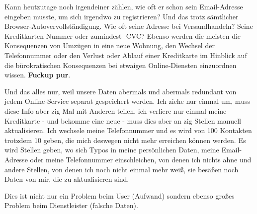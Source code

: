 \vspace{0.3cm}


\begin{Problem}

Kann heutzutage noch irgendeiner zählen, wie oft er schon sein Email-Adresse eingeben musste, um sich irgendwo zu registrieren? Und das trotz sämtlicher Browser-Autovervollständigung. Wie oft seine Adresse bei Versandhandeln? Seine Kreditkarten-Nummer oder zumindest -CVC? Ebenso werden die meisten die Konsequenzen von Umzügen in eine neue Wohnung, den Wechsel der Telefonnummer oder den Verlust oder Ablauf einer Kreditkarte im Hinblick auf die bürokratischen Konsequenzen bei etwaigen Online-Diensten einzuordnen wissen. \textbf{Fuckup pur}.

Und das alles nur, weil unsere Daten abermals und abermals redundant von jedem Online-Service separat gespeichert werden. Ich ziehe nur einmal um, muss diese Info aber zig Mal mit Anderen teilen. ich verliere nur einmal meine Kreditkarte - und bekomme eine neue - muss dies aber an zig Stellen manuell aktualisieren. Ich wechsele meine Telefonnummer und es wird von 100 Kontakten trotzdem 10 geben, die mich deswegen nicht mehr erreichen können werden. Es wird Stellen geben, wo sich Typos in meine persönlichen Daten, meine Email-Adresse oder meine Telefonnummer einschleichen, von denen ich nichts ahne und andere Stellen, von denen ich noch nicht einmal mehr weiß, sie besäßen noch Daten von mir, die zu aktualisieren sind.

Dies ist nicht nur ein Problem beim User (Aufwand) sondern ebenso großes Problem beim Dienstleister (falsche Daten).

\end{Problem}

\vspace{0.3cm}


